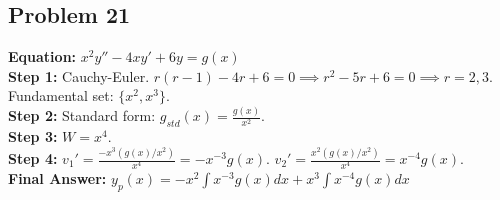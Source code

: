 \documentclass[11pt]{article}
\begin{document}
\subsection*{Problem 21}
\textbf{Equation:} $x^2 y'' - 4xy' + 6y = g(x)$ \\
\textbf{Step 1:} Cauchy-Euler. $r(r-1) - 4r + 6 = 0 \implies r^2 - 5r + 6 = 0 \implies r = 2, 3$. Fundamental set: $\{x^2, x^3\}$. \\
\textbf{Step 2:} Standard form: $g_{std}(x) = \frac{g(x)}{x^2}$. \\
\textbf{Step 3:} $W = x^4$. \\
\textbf{Step 4:} $v_1' = \frac{-x^3(g(x)/x^2)}{x^4} = -x^{-3}g(x)$. $v_2' = \frac{x^2(g(x)/x^2)}{x^4} = x^{-4}g(x)$. \\
\textbf{Final Answer:} $y_p(x) = -x^2\int x^{-3}g(x)dx + x^3\int x^{-4}g(x)dx$
\end{document}
